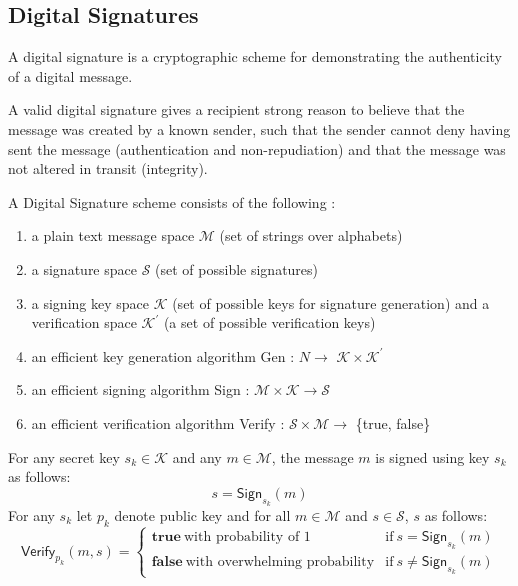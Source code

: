 \documentclass[%
  slidesonly,%
  semlayer%
  ]{seminar}                                  %
\begin{document}
\begin{slide}
  \subsection*{Digital Signatures}
    A digital signature is a cryptographic scheme for demonstrating the authenticity of a digital message.
    
    A valid digital signature gives a recipient strong reason to believe that the message was created by a known sender, such that the sender cannot deny having sent the message (authentication and non-repudiation) and that the message was not altered in transit (integrity).

    A Digital Signature scheme consists of the following :
    \begin{enumerate}
      \item a plain text message space $\mathcal{M}$ (set of strings over alphabets)
      \item a signature space $\mathcal{S}$ (set of possible signatures)
      \item a signing key space $\mathcal{K}$ (set of possible keys for signature generation) and a verification space $\mathcal{K^{'}}$ (a set of possible verification keys)
      \item an efficient key generation algorithm \textsf{Gen} : $N \rightarrow$ $\mathcal{K} \times \mathcal{K^{'}} $ 
      \item an efficient signing algorithm \textsf{Sign} : $ \mathcal{M} \times \mathcal{K} \rightarrow \mathcal{S}$
      \item an efficient verification algorithm \textsf{Verify} : $\mathcal{S} \times \mathcal{M} \rightarrow$ \{true, false\} 
    \end{enumerate}
    For any secret key $s_{k} \in \mathcal{K}$ and any $m \in \mathcal{M}$, the message $m$ is signed using key $s_{k}$ as follows:
      \begin{equation}
        s = \textsf{Sign}_{s_{k}}(m)
        \label{eq:signature}
      \end{equation}
    For any $s_{k}$ let $p_{k}$ denote public key and for all $m \in \mathcal{M}$ and $s \in \mathcal{S}$, $s$ as follows:
    \begin{equation}
      \textsf{Verify}_{p_{k}}(m,s) = 
      \begin{cases}
       \textbf{true}\ \mbox{with probability of 1} & \mbox{if}\ s = \textsf{Sign}_{s_{k}}(m)\\
       \textbf{false}\ \mbox{with overwhelming probability} & \mbox{if}\ s \neq \textsf{Sign}_{s_{k}}(m)

\end{cases}
\end{equation}
\end{slide}
\end{document}

